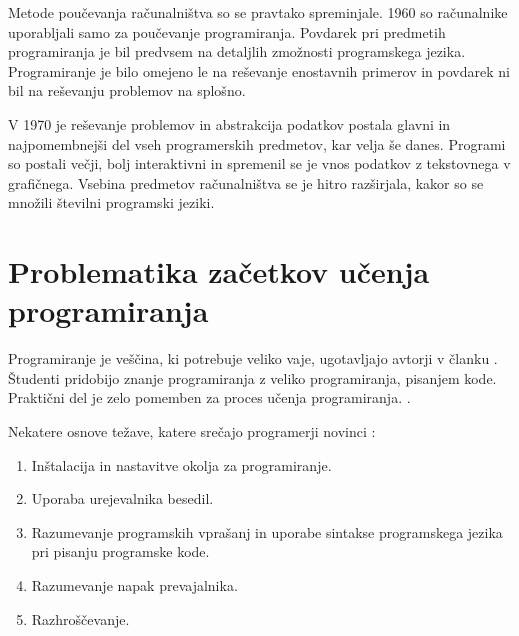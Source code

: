 Metode poučevanja računalništva so se pravtako spreminjale. 1960 so
računalnike uporabljali samo za poučevanje programiranja. Povdarek pri
predmetih programiranja je bil predvsem na detaljlih zmožnosti
programskega jezika. Programiranje je bilo omejeno le na reševanje
enostavnih primerov in povdarek ni bil na reševanju problemov na
splošno.

V 1970 je reševanje problemov in abstrakcija podatkov postala glavni in
najpomembnejši del vseh programerskih predmetov, kar velja še danes.
Programi so postali večji, bolj interaktivni in spremenil se je vnos
podatkov z tekstovnega v grafičnega. Vsebina predmetov računalništva se
je hitro razširjala, kakor so se množili številni programski jeziki.


\section{Problematika začetkov učenja programiranja}
\label{sec:Problematika_začetkov_učenja_programiranja}



Programiranje je veščina, ki potrebuje veliko vaje, ugotavljajo
avtorji v članku \cite{ITaLCP_DistanceEdu}. Študenti pridobijo znanje
programiranja z veliko programiranja, pisanjem kode. Praktični del je
zelo pomemben za proces učenja programiranja.
\cite{ITaLCP_DistanceEdu}.

Nekatere osnove težave, katere srečajo programerji novinci \cite{thesisAWebP}:
\begin{enumerate}
\item
  Inštalacija in nastavitve okolja za programiranje.
\item
  Uporaba urejevalnika besedil.
\item
  Razumevanje programskih vprašanj in uporabe sintakse programskega
  jezika pri pisanju programske kode.
\item
  Razumevanje napak prevajalnika.
\item
  Razhroščevanje.
\end{enumerate}

